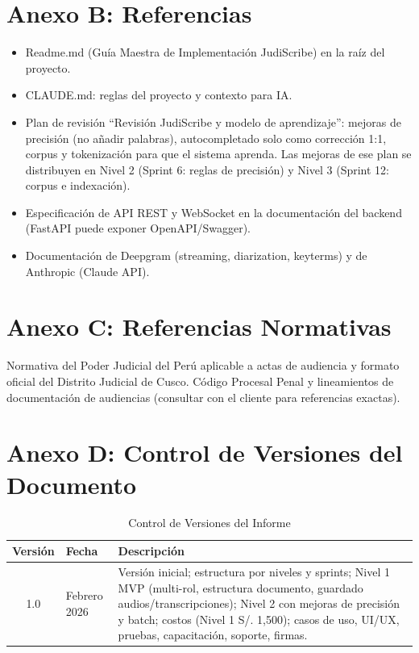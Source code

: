 \documentclass[12pt,a4paper]{report}
\begin{document}
\section{Anexo B: Referencias}

\begin{itemize}
    \item Readme.md (Guía Maestra de Implementación JudiScribe) en la raíz del proyecto.
    \item CLAUDE.md: reglas del proyecto y contexto para IA.
    \item Plan de revisión ``Revisión JudiScribe y modelo de aprendizaje'': mejoras de precisión (no añadir palabras), autocompletado solo como corrección 1:1, corpus y tokenización para que el sistema aprenda. Las mejoras de ese plan se distribuyen en Nivel 2 (Sprint 6: reglas de precisión) y Nivel 3 (Sprint 12: corpus e indexación).
    \item Especificación de API REST y WebSocket en la documentación del backend (FastAPI puede exponer OpenAPI/Swagger).
    \item Documentación de Deepgram (streaming, diarization, keyterms) y de Anthropic (Claude API).
\end{itemize}

\section{Anexo C: Referencias Normativas}

Normativa del Poder Judicial del Perú aplicable a actas de audiencia y formato oficial del Distrito Judicial de Cusco. Código Procesal Penal y lineamientos de documentación de audiencias (consultar con el cliente para referencias exactas).

\section{Anexo D: Control de Versiones del Documento}

\begin{table}[H]
\centering
\small
\begin{tabular}{|c|p{3cm}|p{5cm}|}
\hline
\rowcolor{primaryblue!20}
\textbf{Versión} & \textbf{Fecha} & \textbf{Descripción} \\
\hline
1.0 & Febrero 2026 & Versión inicial; estructura por niveles y sprints; Nivel 1 MVP (multi-rol, estructura documento, guardado audios/transcripciones); Nivel 2 con mejoras de precisión y batch; costos (Nivel 1 S/. 1,500); casos de uso, UI/UX, pruebas, capacitación, soporte, firmas. \\
\hline
\end{tabular}
\caption{Control de Versiones del Informe}
\end{table}
\end{document}
